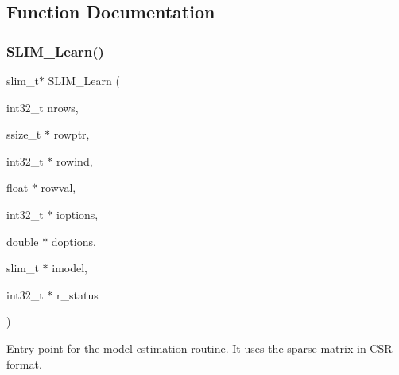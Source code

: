 \subsection{Function Documentation}
\mbox{\label{group__slimapi_ga9c72d34ab6c2ba2b23d9d42ecee601ad}} 
\subsubsection{\texorpdfstring{SLIM\_Learn()}{SLIM\_Learn()}}
{\footnotesize\ttfamily slim\+\_\+t$\ast$ S\+L\+I\+M\+\_\+\+Learn (\begin{DoxyParamCaption}\item[{int32\+\_\+t}]{nrows,  }\item[{ssize\+\_\+t $\ast$}]{rowptr,  }\item[{int32\+\_\+t $\ast$}]{rowind,  }\item[{float $\ast$}]{rowval,  }\item[{int32\+\_\+t $\ast$}]{ioptions,  }\item[{double $\ast$}]{doptions,  }\item[{slim\+\_\+t $\ast$}]{imodel,  }\item[{int32\+\_\+t $\ast$}]{r\+\_\+status }\end{DoxyParamCaption})}



Entry point for the model estimation routine. It uses the sparse matrix in C\+SR format. 


